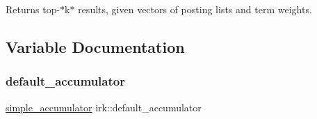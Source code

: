Returns top-\/$\ast$k$\ast$ results, given vectors of posting lists and term weights. 



\subsection{Variable Documentation}
\mbox{\label{namespaceirk_ab2909e62b829f7926f8d47d3146d9939}} 
\subsubsection{\texorpdfstring{default\+\_\+accumulator}{default\_accumulator}}
{\footnotesize\ttfamily \mbox{\hyperlink{classirk_1_1simple__accumulator}{simple\+\_\+accumulator}} irk\+::default\+\_\+accumulator}

